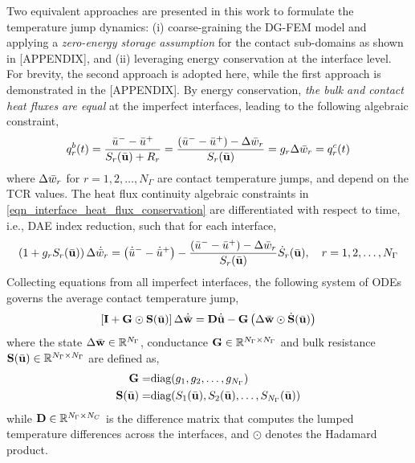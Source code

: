 Two equivalent approaches are presented in this work to formulate the temperature jump dynamics: (i) coarse-graining the DG-FEM model and applying a \emph{zero-energy storage assumption} for the contact sub-domains as shown in [APPENDIX], and (ii) leveraging energy conservation at the interface level. For brevity, the second approach is adopted here, while the first approach is demonstrated in the [APPENDIX]. By energy conservation, \emph{the bulk and contact heat fluxes are equal} at the imperfect interfaces, leading to the following algebraic constraint,
\begin{equation}
    q^{b}_r(t) = \frac{\bar{u}^{-}-\bar{u}^{+}}{S_r(\bar{\mathbf{u}}) + R_{r}} = \frac{\left(\bar{u}^{-} - \bar{u}^{+}\right) - \Delta\bar{w}_r}{S_r(\bar{\mathbf{u}})} = g_{r}\Delta\bar{w}_r = q^{c}_r(t)\label{eqn_interface_heat_flux_conservation}
\end{equation}
where $\Delta\bar{w}_r$ for $r=1,2,\dots,N_{\Gamma}$ are contact temperature jumps, and depend on the TCR values. The heat flux continuity algebraic constraints in \cref{eqn_interface_heat_flux_conservation} are differentiated with respect to time, i.e., DAE index reduction, such that for each interface,
\begin{equation}
    \left(1 + g_r S_r(\bar{\mathbf{u}})\right)\Delta\dot{\bar{w}}_r = \bigl(\dot{\bar{u}}^{-} - \dot{\bar{u}}^{+}\bigr) - \frac{\left(\bar{u}^{-} - \bar{u}^{+}\right) - \Delta\bar{w}_r}{S_r(\bar{\mathbf{u}})}\dot{S}_r(\bar{\mathbf{u}}),\quad r=1,2,\dots,N_{\Gamma}\label{eqn_temperature_jump_dynamics_r}
\end{equation}
Collecting equations from all imperfect interfaces, the following system of ODEs governs the average contact temperature jump,
\begin{equation}
    \left[\mathbf{I} + \mathbf{G}\odot\mathbf{S}(\bar{\mathbf{u}})\right]\Delta\dot{\bar{\mathbf{w}}} = \mathbf{D}\dot{\bar{\mathbf{u}}} - \mathbf{G}\left(\Delta\bar{\mathbf{w}}\odot\dot{\mathbf{S}}(\bar{\mathbf{u}})\right)
\end{equation}
where the state $\Delta\bar{\mathbf{w}}\in\mathbb{R}^{N_{\Gamma}}$, conductance $\mathbf{G}\in\mathbb{R}^{N_{\Gamma}\times N_{\Gamma}}$ and bulk resistance $\mathbf{S}(\bar{\mathbf{u}})\in\mathbb{R}^{N_{\Gamma}\times N_{\Gamma}}$ are defined as,
\begin{subequations}
    \begin{align}
        \mathbf{G} =& \text{diag}(g_1, g_2, \dots, g_{N_{\Gamma}})\\
        \mathbf{S}(\bar{\mathbf{u}}) =& \text{diag}(S_1(\bar{\mathbf{u}}), S_2(\bar{\mathbf{u}}), \dots, S_{N_{\Gamma}}(\bar{\mathbf{u}}))
    \end{align}
\end{subequations}
while $\mathbf{D}\in\mathbb{R}^{N_{\Gamma}\times N_C}$ is the difference matrix that computes the lumped temperature differences across the interfaces, and $\odot$ denotes the Hadamard product. 

